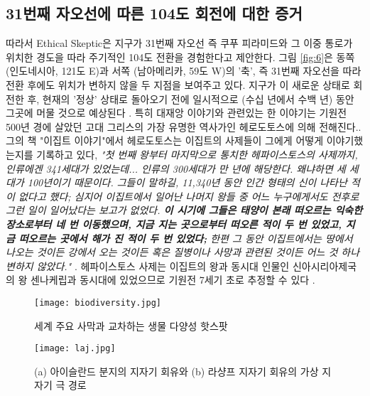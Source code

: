 \documentclass[10pt,twocolumn,letterpaper]{article}
\begin{document}
\begin{개요}
\section{31번째 자오선에 따른  104도 회전에 대한 증거}

따라서 Ethical Skeptic은 지구가 31번째 자오선 즉 쿠푸 피라미드와 그 이중 통로가 위치한 경도을 따라 주기적인 104도 전환을 경험한다고 제안한다. 그림 \ref{fig:6}은 동쪽 (인도네시아, 121도 E)과 서쪽 (남아메리카, 59도 W)의 '축', 즉 31번째 자오선을 따라 전환 후에도 위치가 변하지 않을 두 지점을 보여주고 있다. 지구가 이 새로운 상태로 회전한 후, 현재의 '정상' 상태로 돌아오기 전에 일시적으로 (수십 년에서 수백 년) 동안 그곳에 머물 것으로 예상된다 \cite{150}.
특히 대재앙 이야기와 관련있는 한 이야기는 기원전 500년 경에 살았던 고대 그리스의 가장 유명한 역사가인 헤로도토스에 의해 전해진다.\cite{31}. 그의 책 "이집트 이야기"에서 헤로도토스는 이집트의 사제들이 그에게 어떻게 이야기했는지를 기록하고 있다, \textit{"첫 번째 왕부터 마지막으로 통치한 헤파이스토스의 사제까지, 인류에겐  341세대가 있었는데... 인류의 300세대가 만 년에 해당한다. 왜냐하면 세 세대가 100년이기 때문이다. 그들이 말하길, 11,340년 동안 인간 형태의 신이 나타난 적이 없다고 했다; 심지어 이집트에서 일어난 나머지 왕들 중 어느 누구에게서도 전후로 그런 일이 일어났다는 보고가 없었다. \textbf{이 시기에 그들은 태양이 본래 떠오르는 익숙한 장소로부터 네 번 이동했으며, 지금 지는 곳으로부터 떠오른 적이 두 번 있었고, 지금 떠오르는 곳에서 해가 진 적이 두 번 있었다;} 한편 그 동안  이집트에서는 땅에서 나오는 것이든 강에서 오는 것이든 혹은 질병이나 사망과 관련된 것이든 어느 것 하나 변하지 않았다."} \cite{32}. 헤파이스토스 사제는 이집트의 왕과 동시대 인물인 신아시리아제국의 왕 센나케립과 동시대에 있었으므로 기원전 7세기 초로 추정할 수 있다 \cite{32,33,34}.

\begin{figure*}[t]
\begin{center}
\texttt{[image: biodiversity.jpg]}
\end{center}
   \caption{세계 주요 사막과 교차하는 생물 다양성 핫스팟 \cite{28}}
\label{fig:9}
\end{figure*}

\begin{figure}[t]
\begin{center}
   \texttt{[image: laj.jpg]}
\end{center}
   \caption{(a) 아이슬란드 분지의 지자기 회유와 (b) 라샹프 지자기 회유의 가상 지자기 극 경로 \cite{35}}
\label{fig:7}
\label{fig:onecol}
\end{figure}


\end{개요}
\end{document}
